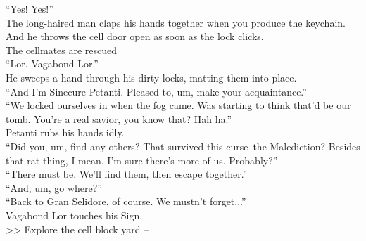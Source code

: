 “Yes! Yes!”\\

The long-haired man claps his hands together when you produce the keychain. And he throws the cell door open as soon as the lock clicks.\\
 The cellmates are rescued\\

“Lor. Vagabond Lor.”\\
He sweeps a hand through his dirty locks, matting them into place.\\

“And I’m Sinecure Petanti. Pleased to, um, make your acquaintance.”\\

“We locked ourselves in when the fog came. Was starting to think that’d be our tomb. You’re a real savior, you know that? Hah ha.”\\

Petanti rubs his hands idly.\\
“Did you, um, find any others? That survived this curse--the Malediction? Besides that rat-thing, I mean. I’m sure there’s more of us. Probably?”\\

“There must be. We’ll find them, then escape together.”\\

“And, um, go where?”\\

“Back to Gran Selidore, of course. We mustn’t forget...”\\

Vagabond Lor touches his Sign.\\

>> Explore the cell block yard -- 